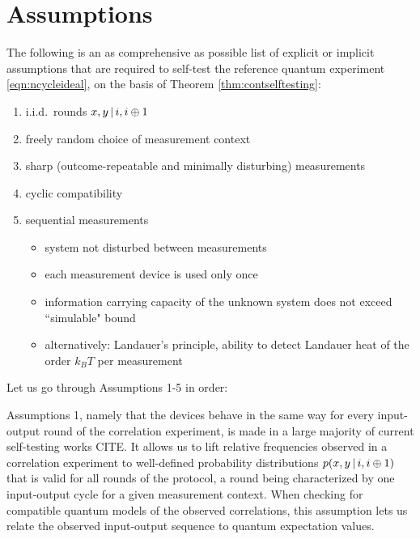 \section{Assumptions}
\label{sec:kscontass}
The following is an as comprehensive as possible list of explicit or implicit assumptions that are required to self-test the reference quantum experiment \ref{eqn:ncycleideal}, on the basis of Theorem \ref{thm:contselftesting}:
\begin{enumerate}
    \item i.i.d.\ rounds $x,y \thinspace\vert\thinspace i,i\oplus 1$
    \item freely random choice of measurement context
    \item sharp (outcome-repeatable and minimally disturbing) measurements 
    \item cyclic compatibility
    \item sequential measurements
    \begin{itemize}
        \item system not disturbed between measurements
        \item each measurement device is used only once
        \item information carrying capacity of the unknown system does not exceed ``simulable" bound
        \item alternatively: Landauer's principle, ability to detect Landauer heat of the order $k_B T$ per measurement
    \end{itemize}
\end{enumerate}

Let us go through Assumptions 1-5 in order:

Assumptions 1, namely that the devices behave in the same way for every input-output round of the correlation experiment, is made in a large majority of current self-testing works CITE. It allows us to lift relative frequencies observed in a correlation experiment to well-defined probability distributions $p(x,y\thinspace\vert\thinspace i, i\oplus 1)$ that is valid for all rounds of the protocol, a round being characterized by one input-output cycle for a given measurement context. When checking for compatible quantum models of the observed correlations, this assumption lets us relate the observed input-output sequence to quantum expectation values.

